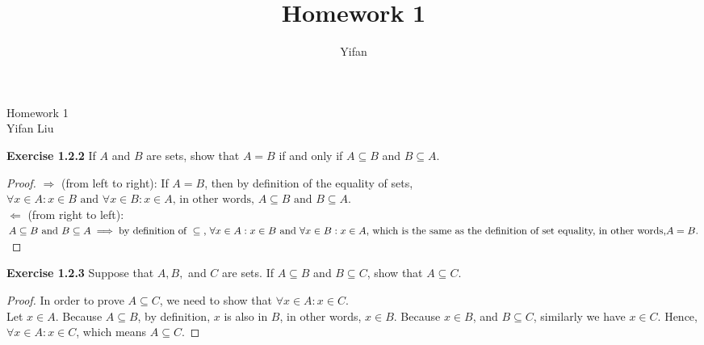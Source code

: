 \documentclass[12pt]{article}
\title{Homework 1}
\author{Yifan}
\theoremstyle{definition}
\numberwithin{equation}{subsection}
\begin{document}
\pagestyle{plain}



\begin{center}
{\large Homework 1} \\
\vspace{.2in}
Yifan Liu
\end{center}

\bigskip \bigskip


\textbf{Exercise 1.2.2} If $A$ and $B$ are sets, show that $A = B$ if and only if $A \subseteq B$ and $B \subseteq A$.
\begin{proof}
$\Longrightarrow$ (from left to right): If $A = B$, then by definition of the equality of sets, $\forall x \in A: x \in B \text{ and } \forall x \in B: x \in A \text{, in other words, } A \subseteq B \text{ and } B \subseteq A \text{.}$\\
$\Longleftarrow$ (from right to left): $A \subseteq B \text{ and } B \subseteq A \implies \text{by definition of } \subseteq \text{, } \forall x \in A: x \in B \text{ and } \forall x \in B: x \in A \text{, which is the same as the definition of set equality, in other words,}\\ A = B \text{.}$
\end{proof}

\textbf{Exercise 1.2.3} Suppose that \(A, B,\) and \(C\) are sets. If \(A \subseteq B\) and \(B \subseteq C\), show that \(A \subseteq C\).

\begin{proof}
In order to prove $A \subseteq C$, we need to show that $\forall x \in A: x \in C$. \\
Let $x \in A$. Because $A \subseteq B$, by definition, $x$ is also in $B$, in other words, $x \in B$. Because $x \in B$, and $B \subseteq C$, similarly we have $x \in C$. Hence, $\forall x \in A: x \in C$, which means $A \subseteq C$.
\end{proof}
\end{document}

